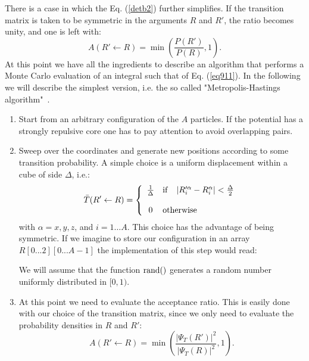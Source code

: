 There is a case in which the Eq. (\ref{detb2}) further simplifies. If the transition matrix is taken to 
be symmetric in the arguments $R$ and $R'$, the ratio becomes unity, and one is left with:
\begin{equation}
A(R'\leftarrow R)=\min\left(\frac{P(R')}{P(R)},1\right).
\label{detb2}
\end{equation} 
At this point we have all the ingredients to describe an algorithm that performs a Monte Carlo evaluation
of an integral such that of Eq. (\ref{eq911}). In the following we will describe the simplest version,
i.e. the so called "Metropolis-Hastings algorithm"~\cite{Metropolis53,Hastings70}. 
\begin{enumerate}
	\item
	Start from an arbitrary configuration of the $A$ particles. If the potential has a strongly repulsive core one has to pay attention to avoid overlapping pairs.
	\item
	Sweep over the coordinates and generate new positions according to some transition probability. A simple choice is a uniform displacement within a cube of side $\Delta$, i.e.:
	\begin{equation}
	  \bar{T}(R'\leftarrow R)=\left\{ 
	  \begin{array}{cl}
	  \frac{1}{\Delta}&{\rm if \ \ \  } |R'^\alpha_i-R^\alpha_i|<\frac{\Delta}{2}\\
	  \\
	  0&{\rm otherwise}
	  \end{array}
	     \right.
	\end{equation}
	with $\alpha =x,y,z$, and $i=1\dots A$. This choice has the advantage of being symmetric. If we imagine
	to store our configuration in an array $R[0...2][0...A-1]$ the implementation of this step would read:
	\begin{algorithmic} 
		\EndFor
		\EndFor
	\end{algorithmic}
    We will assume that the function ${\rm rand}()$ generates a random number uniformly distributed
    in $[0,1)$.
    \item 
    At this point we need to evaluate the acceptance ratio. This is easily done with our choice of the transition matrix, since we only need to evaluate the probability densities in $R$ and $R'$:
    \begin{equation}
    A(R'\leftarrow R)=\min\left(\frac{|\Psi_T(R')|^2}{|\Psi_T(R)|^2},1\right).

\end{equation}
\end{enumerate}
